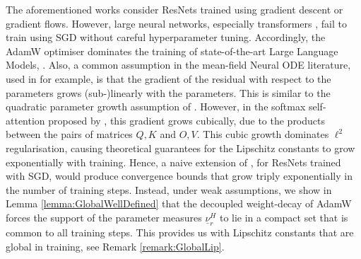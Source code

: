 \documentclass{article}
\begin{document}
The aforementioned works consider ResNets trained using gradient descent or gradient flows. However, large neural networks, especially transformers \cite{zhao2025deconstructingmakesgoodoptimizer}, fail to train using SGD without careful hyperparameter tuning. Accordingly, the AdamW optimiser \cite{loshchilov2018decoupled} dominates the training of state-of-the-art Large Language Models, \cite{brown2020languagemodelsfewshotlearners,grattafiori2024llama3herdmodels,deepseekai2025deepseekv3technicalreport}. Also, a common assumption in the mean-field Neural ODE literature, used in \cite{ding2021globalconvergencegradientdescent,gao2024global,isobe2024convergenceresultcontinuousmodel} for example, is that the gradient of the residual with respect to the parameters grows (sub-)linearly with the parameters.  This is similar to the quadratic parameter growth assumption of \cite{barboni2025understandingtraininginfinitelydeep}. However, in the softmax self-attention proposed by \cite{NIPS2017_3f5ee243}, this gradient grows cubically, due to the products between the pairs of matrices $Q,K$ and $O,V$. This cubic growth dominates $\ell^2$ regularisation, causing theoretical guarantees for the Lipschitz constants to grow exponentially with training. Hence, a naive extension of \cite{chizat2018globalconvergencegradientdescent}, for ResNets trained with SGD, would produce convergence bounds that grow triply exponentially in the number of training steps. Instead, under weak assumptions, we show in Lemma \ref{lemma:GlobalWellDefined} that the decoupled weight-decay of AdamW forces the support of the parameter measures $\underline{\nu}_r^H$ to lie in a compact set that is common to all training steps. This provides us with Lipschitz constants that are global in training, see Remark \ref{remark:GlobalLip}.
\end{document}
